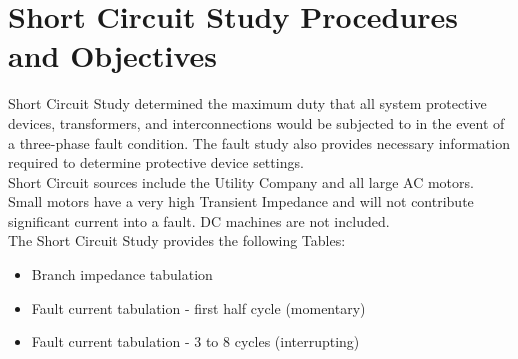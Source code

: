 \section{Short Circuit Study Procedures and Objectives}
\label{af:scco}

\noindent Short Circuit Study determined the maximum duty that all system protective devices, transformers, and interconnections would be subjected to in the event
of a three-phase fault condition. The fault study also provides necessary information required to determine protective device settings.\\

\noindent Short Circuit sources include the Utility Company and all large AC motors. Small motors have a very high Transient Impedance and will not contribute significant current into a fault. DC machines are not included.\\

\noindent The Short Circuit Study provides the following Tables:
\begin{itemize}
	\item Branch impedance tabulation
	\item Fault current tabulation - first half cycle (momentary)
	\item Fault current tabulation - 3 to 8 cycles (interrupting)
\end{itemize}

\vspace{5mm}


